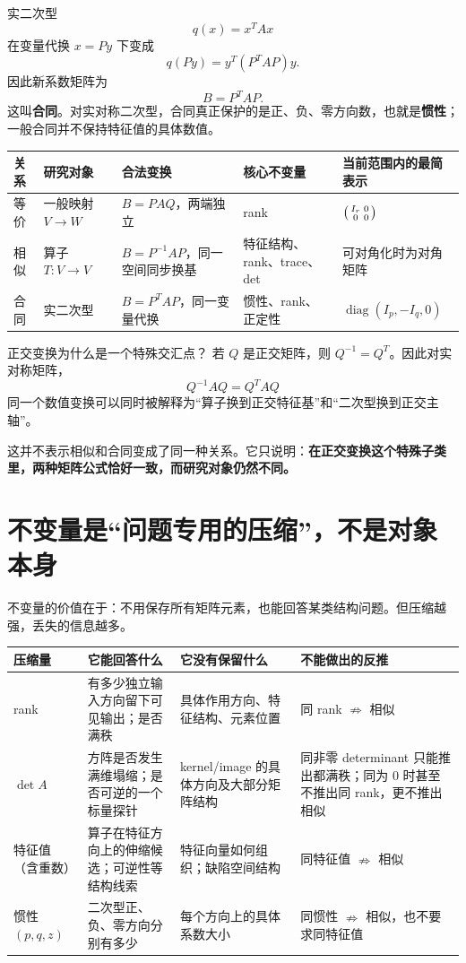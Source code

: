 \documentclass[11pt,a4paper]{ctexart}
\newcommand{\kw}[1]{\textbf{\color{deep}#1}}
\begin{document}
实二次型
\[
q(x)=x^TAx
\]
在变量代换 $x=Py$ 下变成
\[
q(Py)=y^T(P^TAP)y.
\]
因此新系数矩阵为
\[
\boxed{B=P^TAP}.
\]
这叫\kw{合同}。对实对称二次型，合同真正保护的是正、负、零方向数，也就是\kw{惯性}；一般合同并不保持特征值的具体数值。

\begin{longtable}{L{2.4cm}L{3.5cm}L{3.8cm}L{3.2cm}L{3.3cm}}
\toprule
\textbf{关系} & \textbf{研究对象} & \textbf{合法变换} & \textbf{核心不变量} & \textbf{当前范围内的最简表示}\\
\midrule
等价 & 一般映射 $V\to W$ & $B=PAQ$，两端独立 & rank & $\begin{psmallmatrix}I_r&0\\0&0\end{psmallmatrix}$\\
相似 & 算子 $T:V\to V$ & $B=P^{-1}AP$，同一空间同步换基 & 特征结构、rank、trace、det & 可对角化时为对角矩阵\\
合同 & 实二次型 & $B=P^TAP$，同一变量代换 & 惯性、rank、正定性 & $\operatorname{diag}(I_p,-I_q,0)$\\
\bottomrule
\end{longtable}

\begin{methodbox}{正交变换为什么是一个特殊交汇点？}
若 $Q$ 是正交矩阵，则 $Q^{-1}=Q^T$。因此对实对称矩阵，
\[
Q^{-1}AQ=Q^TAQ
\]
同一个数值变换可以同时被解释为“算子换到正交特征基”和“二次型换到正交主轴”。

这并不表示相似和合同变成了同一种关系。它只说明：\kw{在正交变换这个特殊子类里，两种矩阵公式恰好一致，而研究对象仍然不同。}
\end{methodbox}

\section{不变量是“问题专用的压缩”，不是对象本身}

不变量的价值在于：不用保存所有矩阵元素，也能回答某类结构问题。但压缩越强，丢失的信息越多。

\begin{longtable}{L{2.8cm}L{4.2cm}L{4.4cm}L{4.2cm}}
\toprule
\textbf{压缩量} & \textbf{它能回答什么} & \textbf{它没有保留什么} & \textbf{不能做出的反推}\\
\midrule
rank & 有多少独立输入方向留下可见输出；是否满秩 & 具体作用方向、特征结构、元素位置 & 同 rank $\nRightarrow$ 相似\\
$\det A$ & 方阵是否发生满维塌缩；是否可逆的一个标量探针 & kernel/image 的具体方向及大部分矩阵结构 & 同非零 determinant 只能推出都满秩；同为 $0$ 时甚至不推出同 rank，更不推出相似\\
特征值（含重数） & 算子在特征方向上的伸缩候选；可逆性等结构线索 & 特征向量如何组织；缺陷空间结构 & 同特征值 $\nRightarrow$ 相似\\
惯性 $(p,q,z)$ & 二次型正、负、零方向分别有多少 & 每个方向上的具体系数大小 & 同惯性 $\nRightarrow$ 相似，也不要求同特征值\\
\bottomrule
\end{longtable}
\end{document}
